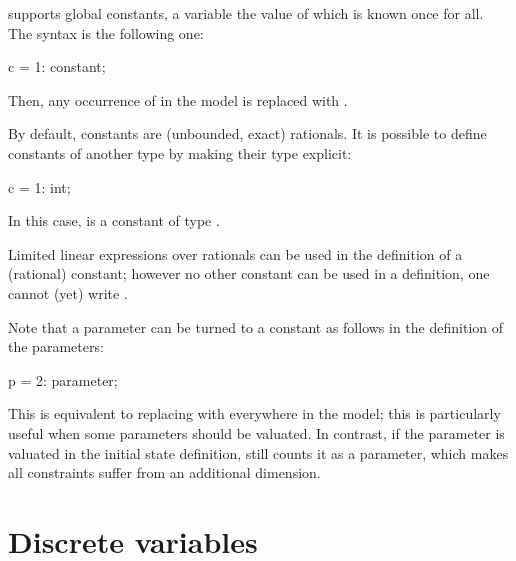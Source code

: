 \imitator{} supports global constants, \ie{} a variable the value of which is known once for all.
The syntax is the following one:

\begin{IMITATORmodel}
c = 1: constant;
\end{IMITATORmodel}

Then, any occurrence of  in the model is replaced with .

By default, constants are (unbounded, exact) rationals.
It is possible to define constants of another type by making their type explicit:

\begin{IMITATORmodel}
c = 1: int;
\end{IMITATORmodel}

In this case,  is a constant of type .

Limited linear expressions over rationals can be used in the definition of a (rational) constant; however no other constant can be used in a definition, \ie{} one cannot (yet) write .


\begin{hint}
	Note that a parameter can be turned to a constant as follows in the definition of the parameters:

\begin{IMITATORmodel}
p = 2: parameter;
\end{IMITATORmodel}

	This is equivalent to replacing  with  everywhere in the model; this is particularly useful when some parameters should be valuated.
	In contrast, if the parameter is valuated in the initial state definition, \imitator{} still counts it as a parameter, which makes all constraints suffer from an additional dimension.
\end{hint}





\section{Discrete variables}\label{section:discrete}


